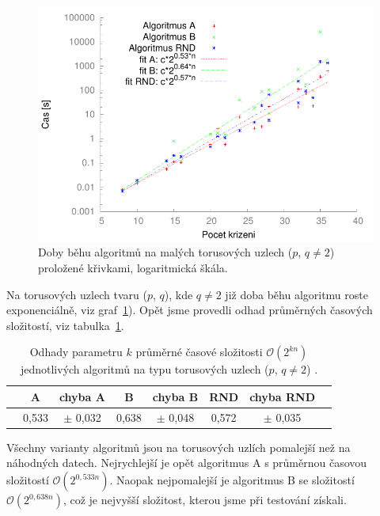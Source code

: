 \begin{figure}[p]\centering
\includegraphics{../img/torusNe2FIT}
\caption{Doby běhu algoritmů na malých torusových uzlech ($p$, $q\neq 2$) proložené křivkami, logaritmická škála.}
\label{obr03:torusFIT}
\end{figure}

Na torusových uzlech tvaru ($p$, $q$), kde $q\neq 2$ již doba běhu algoritmu roste exponenciálně, viz graf~\ref{obr03:torusFIT}). Opět jsme provedli odhad průměrných časových složitostí, viz tabulka~\ref{torustab}.

\begin{table}[b]
\centering
  \begin{tabular}{*{8}{c}}
    \toprule
       & A & chyba A & B & chyba B &  RND & chyba RND \\ 
    \midrule
      & 0,533 & $\pm$ 0,032  &   0,638 & $\pm$ 0,048   &  0,572 & $\pm$ 0,035\\
    \bottomrule
  \end{tabular}
    \caption{Odhady parametru $k$ průměrné časové složitosti $\mathcal{O}(2^{kn})$ jednotlivých algoritmů na typu torusových uzlech ($p$, $q\neq 2$) .} \label{torustab}
    
\end{table}

Všechny varianty algoritmů jsou na torusových uzlích pomalejší než na náhodných datech. Nejrychlejší je opět algoritmus A s průměrnou časovou složitostí $\mathcal{O}(2^{0,533 n})$. Naopak nejpomalejší je algoritmus B se složitostí $\mathcal{O}(2^{0,638 n})$, což je nejvyšší složitost, kterou jsme při testování získali.